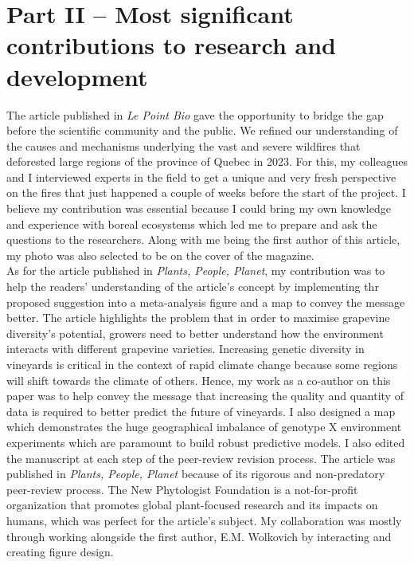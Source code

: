 \documentclass{article}
\begin{document}
\section*{Part II – Most significant contributions to research and development}
The article published in \textit{Le Point Bio} gave the opportunity to bridge the gap before the scientific community and the public. We refined our understanding of the causes and mechanisms underlying the vast and severe wildfires that deforested large regions of the province of Quebec in 2023. For this, my colleagues and I interviewed experts in the field to get a unique and very fresh perspective on the fires that just happened a couple of weeks before the start of the project. I believe my contribution was essential because I could bring my own knowledge and experience with boreal ecosystems which led me to prepare and ask the questions to the researchers. Along with me being the first author of this article, my photo was also selected to be on the cover of the magazine. \\
As for the article published in \textit{Plants, People, Planet}, my contribution was to help the readers' understanding of the article's concept by implementing thr proposed suggestion into a meta-analysis figure and a map to convey the message better. The article highlights the problem that in order to maximise grapevine diversity's potential, growers need to better understand how the environment interacts with different grapevine varieties. Increasing genetic diversity in vineyards is critical in the context of rapid climate change because some regions will shift towards the climate of others. Hence, my work as a co-author on this paper was to help convey the message that increasing the quality and quantity of data is required to better predict the future of vineyards. I also designed a map which demonstrates the huge geographical imbalance of genotype X environment experiments which are paramount to build robust predictive models. I also edited the manuscript at each step of the peer-review revision process. The article was published in \textit{Plants, People, Planet} because of its rigorous and non-predatory peer-review process. The New Phytologist Foundation is a not-for-profit organization that promotes global plant-focused research and its impacts on humans, which was perfect for the article's subject. My collaboration was mostly through working alongside the first author, E.M. Wolkovich by interacting and creating figure design. 
\end{document}
